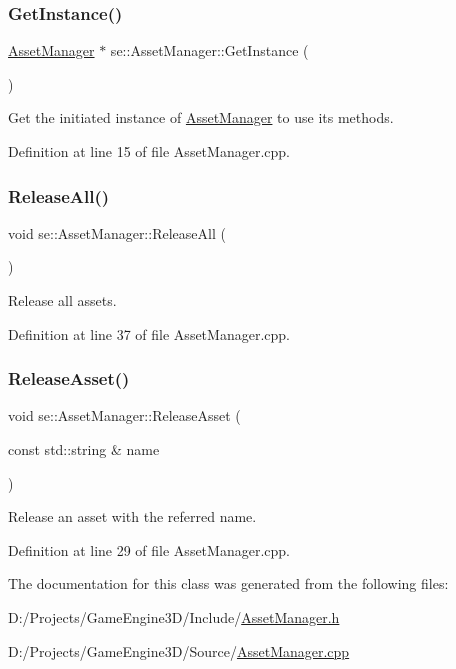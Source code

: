 \subsubsection{\texorpdfstring{Get\+Instance()}{GetInstance()}}
{\footnotesize\ttfamily \mbox{\hyperlink{classse_1_1_asset_manager}{Asset\+Manager}} $\ast$ se\+::\+Asset\+Manager\+::\+Get\+Instance (\begin{DoxyParamCaption}{ }\end{DoxyParamCaption})\hspace{0.3cm}{\ttfamily [static]}}

Get the initiated instance of \mbox{\hyperlink{classse_1_1_asset_manager}{Asset\+Manager}} to use its methods. 

Definition at line 15 of file Asset\+Manager.\+cpp.

\mbox{\label{classse_1_1_asset_manager_ada6844330b41f132c000b4f96657a0ac}} 
\subsubsection{\texorpdfstring{Release\+All()}{ReleaseAll()}}
{\footnotesize\ttfamily void se\+::\+Asset\+Manager\+::\+Release\+All (\begin{DoxyParamCaption}{ }\end{DoxyParamCaption})}

Release all assets. 

Definition at line 37 of file Asset\+Manager.\+cpp.

\mbox{\label{classse_1_1_asset_manager_a3cd3506b7003d63adbd1cd0f94c8931e}} 
\subsubsection{\texorpdfstring{Release\+Asset()}{ReleaseAsset()}}
{\footnotesize\ttfamily void se\+::\+Asset\+Manager\+::\+Release\+Asset (\begin{DoxyParamCaption}\item[{const std\+::string \&}]{name }\end{DoxyParamCaption})}

Release an asset with the referred name. 

Definition at line 29 of file Asset\+Manager.\+cpp.



The documentation for this class was generated from the following files\+:\begin{DoxyCompactItemize}
\item 
D\+:/\+Projects/\+Game\+Engine3\+D/\+Include/\mbox{\hyperlink{_asset_manager_8h}{Asset\+Manager.\+h}}\item 
D\+:/\+Projects/\+Game\+Engine3\+D/\+Source/\mbox{\hyperlink{_asset_manager_8cpp}{Asset\+Manager.\+cpp}}\end{DoxyCompactItemize}
